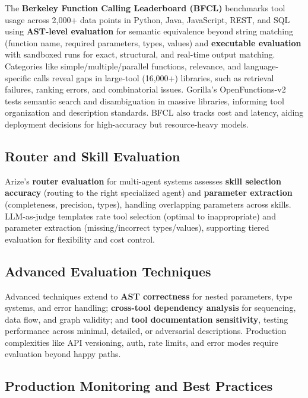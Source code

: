 \begin{TNtwocol}
The \textbf{Berkeley Function Calling Leaderboard (BFCL)} benchmarks tool usage across 2,000+ data points in Python, Java, JavaScript, REST, and SQL using \textbf{AST-level evaluation} for semantic equivalence beyond string matching (function name, required parameters, types, values) and \textbf{executable evaluation} with sandboxed runs for exact, structural, and real-time output matching. Categories like simple/multiple/parallel functions, relevance, and language-specific calls reveal gaps in large-tool (16,000+) libraries, such as retrieval failures, ranking errors, and combinatorial issues. Gorilla’s OpenFunctions-v2 tests semantic search and disambiguation in massive libraries, informing tool organization and description standards. BFCL also tracks cost and latency, aiding deployment decisions for high-accuracy but resource-heavy models.
​

\subsection*{Router and Skill Evaluation}

Arize’s \textbf{router evaluation} for multi-agent systems assesses \textbf{skill selection accuracy} (routing to the right specialized agent) and \textbf{parameter extraction} (completeness, precision, types), handling overlapping parameters across skills. LLM-as-judge templates rate tool selection (optimal to inappropriate) and parameter extraction (missing/incorrect types/values), supporting tiered evaluation for flexibility and cost control.
​

\subsection*{Advanced Evaluation Techniques}

Advanced techniques extend to \textbf{AST correctness} for nested parameters, type systems, and error handling; \textbf{cross-tool dependency analysis} for sequencing, data flow, and graph validity; and \textbf{tool documentation sensitivity}, testing performance across minimal, detailed, or adversarial descriptions. Production complexities like API versioning, auth, rate limits, and error modes require evaluation beyond happy paths.

\subsection*{Production Monitoring and Best Practices}


\end{TNtwocol}
